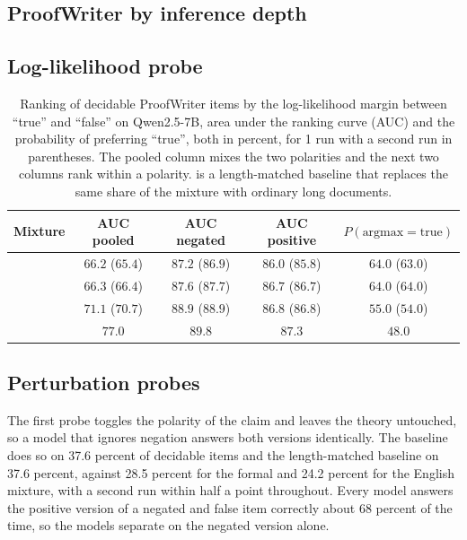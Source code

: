

\subsection{ProofWriter by inference depth}
\label{sec:depth-figure}



\subsection{Log-likelihood probe}
\label{sec:probe-table}

\begin{table}[H]
\caption{Ranking of decidable ProofWriter items by the log-likelihood margin
between ``true'' and ``false'' on Qwen2.5-7B, area under the ranking curve
(AUC) and the probability of preferring ``true'', both in percent, for 1 run with a second run in parentheses. The pooled column mixes the
two polarities and the next two columns rank within a polarity. \longdoc{} is a length-matched baseline that
replaces the same share of the mixture with ordinary long documents.}
\label{tab:probe}
\begin{center}
\small
\begin{tabular}{lcccc}
\toprule
Mixture & AUC pooled & AUC negated & AUC positive & $P(\text{argmax}=\text{true})$ \\
\midrule
\ctrl{}    & $66.2$ ($65.4$) & $87.2$ ($86.9$) & $86.0$ ($85.8$) & $64.0$ ($63.0$) \\
\longdoc{} & $66.3$ ($66.4$) & $87.6$ ($87.7$) & $86.7$ ($86.7$) & $64.0$ ($64.0$) \\
\formal{}  & $71.1$ ($70.7$) & $88.9$ ($88.9$) & $86.8$ ($86.8$) & $55.0$ ($54.0$) \\
\nat{}     & $77.0$          & $89.8$          & $87.3$          & $48.0$ \\
\bottomrule
\end{tabular}
\end{center}
\end{table}

\subsection{Perturbation probes}
\label{sec:perturbation}

The first probe toggles the polarity of the claim and leaves the theory
untouched, so a model that ignores negation answers both versions
identically. The baseline does so on 37.6 percent of decidable items and the
length-matched baseline on 37.6 percent, against 28.5 percent for the formal
and 24.2 percent for the English mixture, with a second run within half a
point throughout. Every model answers the positive version of a negated and
false item correctly about 68 percent of the time, so the models separate on
the negated version alone.


